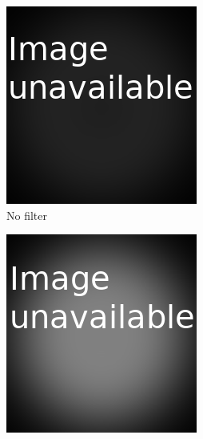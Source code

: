 \begin{figure}
  \centering
    \begin{subfigure}[b]{0.4\textwidth}
      \includegraphics[width=\textwidth]{../figures/literatureReview/literature_hardening_noFilter.png}
      \caption{No filter}
    \end{subfigure}
    \begin{subfigure}[b]{0.4\textwidth}
      \includegraphics[width=\textwidth]{../figures/literatureReview/literature_hardening_filter.png}

\end{subfigure}
\end{figure}
